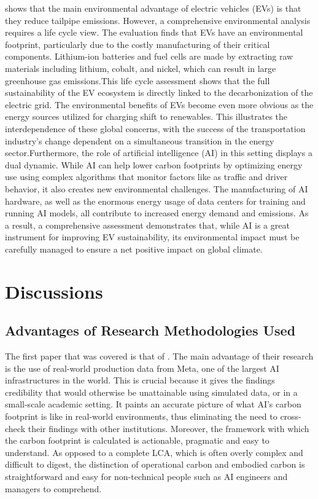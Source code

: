 \documentclass[a4paper, 12pt]{article}
\begin{document}
\par \citet{M.rauf2024} shows that the main environmental advantage of electric vehicles (EVs) is that they reduce tailpipe emissions. However, a comprehensive environmental analysis requires a life cycle view. The evaluation finds that EVs have an environmental footprint, particularly due to the costly manufacturing of their critical components. Lithium-ion batteries and fuel cells are made by extracting raw materials including lithium, cobalt, and nickel, which can result in large greenhouse gas emissions.This life cycle assessment shows that the full sustainability of the EV ecosystem is directly linked to the decarbonization of the electric grid.  The environmental benefits of EVs become even more obvious as the energy sources utilized for charging shift to renewables.  This illustrates the interdependence of these global concerns, with the success of the transportation industry's change dependent on a simultaneous transition in the energy sector.Furthermore, the role of artificial intelligence (AI) in this setting displays a dual dynamic.  While AI can help lower carbon footprints by optimizing energy use using complex algorithms that monitor factors like as traffic and driver behavior, it also creates new environmental challenges.  The manufacturing of AI hardware, as well as the enormous energy usage of data centers for training and running AI models, all contribute to increased energy demand and emissions.  As a result, a comprehensive assessment demonstrates that, while AI is a great instrument for improving EV sustainability, its environmental impact must be carefully managed to ensure a net positive impact on global climate.

\section{Discussions}
\subsection{Advantages of Research Methodologies Used}
The first paper that was covered is that of \citet{Wu2022}. The main advantage of their research is the use of real-world production data from Meta, one of the largest AI infrastructures in the world. This is crucial because it gives the findings credibility that would otherwise be unattainable using simulated data, or in a small-scale academic setting. It paints an accurate picture of what AI's carbon footprint is like in real-world environments, thus eliminating the need to cross-check their findings with other institutions. Moreover, the framework with which the carbon footprint is calculated is actionable, pragmatic and easy to understand. As opposed to a complete LCA, which is often overly complex and difficult to digest, the distinction of operational carbon and embodied carbon is straightforward and easy for non-technical people such as AI engineers and managers to comprehend.\hfill \break
\end{document}
